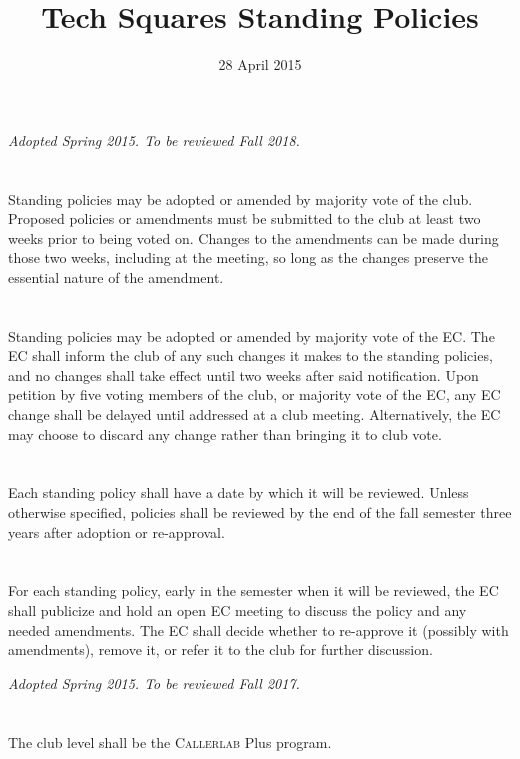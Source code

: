 \documentclass{bylaws}
\title{Tech Squares Standing Policies}
\date{28 April 2015}
\newcommand{\sptimes}[2]{\emph{Adopted #1. To be reviewed #2.}}
\begin{document}
\maketitle

\sptimes{Spring 2015}{Fall 2018}
\section{}Standing policies may be adopted or amended by majority vote of the club. Proposed policies or amendments must be submitted to the club at least two weeks prior to being voted on. Changes to the amendments can be made during those two weeks, including at the meeting, so long as the changes preserve the essential nature of the amendment.
\section{}Standing policies may be adopted or amended by majority vote of the EC. The EC shall inform the club of any such changes it makes to the standing policies, and no changes shall take effect until two weeks after said notification. Upon petition by five voting members of the club, or majority vote of the EC, any EC change shall be delayed until addressed at a club meeting. Alternatively, the EC may choose to discard any change rather than bringing it to club vote.
\section{}Each standing policy shall have a date by which it will be reviewed. Unless otherwise specified, policies shall be reviewed by the end of the fall semester three years after adoption or re-approval.
\section{}For each standing policy, early in the semester when it will be reviewed, the EC shall publicize and hold an open EC meeting to discuss the policy and any needed amendments. The EC shall decide whether to re-approve it (possibly with amendments), remove it, or refer it to the club for further discussion.


\sptimes{Spring 2015}{Fall 2017}
\section{}The club level shall be the \textsc{Callerlab} Plus program.
\end{document}
